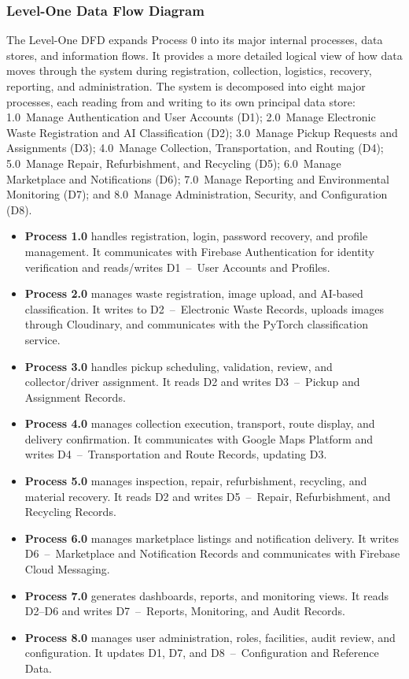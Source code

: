 \subsubsection{Level-One Data Flow Diagram}

The Level-One DFD expands Process 0 into its major internal processes,
data stores, and information flows. It provides a more detailed logical view of
how data moves through the system during registration, collection, logistics,
recovery, reporting, and administration. The system is decomposed into eight
major processes, each reading from and writing to its own principal data
store: 1.0~Manage Authentication and User Accounts (D1); 2.0~Manage
Electronic Waste Registration and AI Classification (D2); 3.0~Manage Pickup
Requests and Assignments (D3); 4.0~Manage Collection, Transportation, and
Routing (D4); 5.0~Manage Repair, Refurbishment, and Recycling (D5);
6.0~Manage Marketplace and Notifications (D6); 7.0~Manage Reporting and
Environmental Monitoring (D7); and 8.0~Manage Administration, Security,
and Configuration (D8).

\begin{itemize}
  \item \textbf{Process 1.0} handles registration, login, password recovery, and
    profile management. It communicates with Firebase Authentication for
    identity verification and reads/writes D1~--~User Accounts and Profiles.
  \item \textbf{Process 2.0} manages waste registration, image upload, and
    AI-based classification. It writes to D2~--~Electronic Waste Records,
    uploads images through Cloudinary, and communicates with the PyTorch
    classification service.
  \item \textbf{Process 3.0} handles pickup scheduling, validation, review, and
    collector/driver assignment. It reads D2 and writes D3~--~Pickup and
    Assignment Records.
  \item \textbf{Process 4.0} manages collection execution, transport, route
    display, and delivery confirmation. It communicates with Google Maps
    Platform and writes D4~--~Transportation and Route Records, updating D3.
  \item \textbf{Process 5.0} manages inspection, repair, refurbishment,
    recycling, and material recovery. It reads D2 and writes D5~--~Repair,
    Refurbishment, and Recycling Records.
  \item \textbf{Process 6.0} manages marketplace listings and notification
    delivery. It writes D6~--~Marketplace and Notification Records and
    communicates with Firebase Cloud Messaging.
  \item \textbf{Process 7.0} generates dashboards, reports, and monitoring
    views. It reads D2--D6 and writes D7~--~Reports, Monitoring, and Audit
    Records.
  \item \textbf{Process 8.0} manages user administration, roles, facilities,
    audit review, and configuration. It updates D1, D7, and D8~--~Configuration
    and Reference Data.
\end{itemize}


